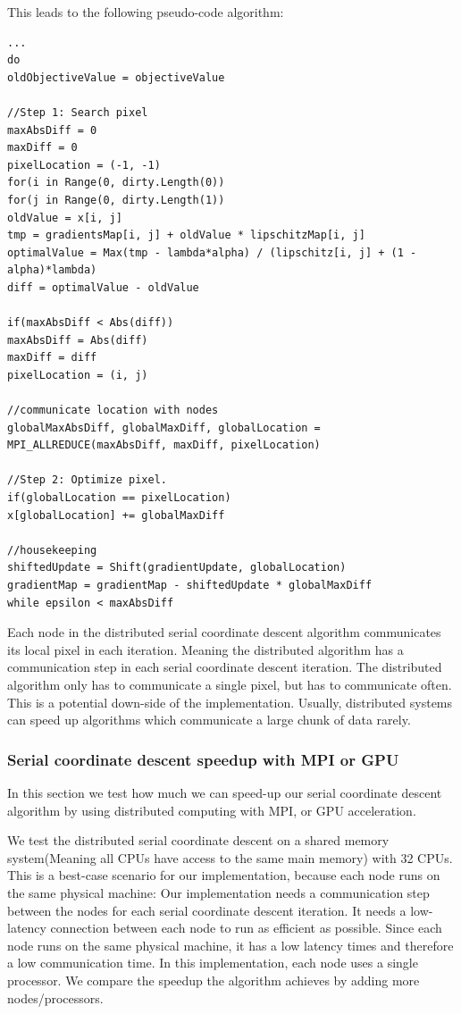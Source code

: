 This leads to the following pseudo-code algorithm:
\begin{lstlisting}
...
do 
oldObjectiveValue = objectiveValue

//Step 1: Search pixel
maxAbsDiff = 0
maxDiff = 0
pixelLocation = (-1, -1)
for(i in Range(0, dirty.Length(0))
for(j in Range(0, dirty.Length(1))
oldValue = x[i, j]
tmp = gradientsMap[i, j] + oldValue * lipschitzMap[i, j]
optimalValue = Max(tmp - lambda*alpha) / (lipschitz[i, j] + (1 - alpha)*lambda)
diff = optimalValue - oldValue

if(maxAbsDiff < Abs(diff))
maxAbsDiff = Abs(diff)
maxDiff = diff
pixelLocation = (i, j)

//communicate location with nodes
globalMaxAbsDiff, globalMaxDiff, globalLocation = MPI_ALLREDUCE(maxAbsDiff, maxDiff, pixelLocation)

//Step 2: Optimize pixel.
if(globalLocation == pixelLocation)
x[globalLocation] += globalMaxDiff

//housekeeping
shiftedUpdate = Shift(gradientUpdate, globalLocation)
gradientMap = gradientMap - shiftedUpdate * globalMaxDiff
while epsilon < maxAbsDiff
\end{lstlisting}

Each node in the distributed serial coordinate descent algorithm communicates its local pixel in each iteration. Meaning the distributed algorithm has a communication step in each serial coordinate descent iteration. The distributed algorithm only has to communicate a single pixel, but has to communicate often. This is a potential down-side of the implementation. Usually, distributed systems can speed up algorithms which communicate a large chunk of data rarely.

\subsubsection{Serial coordinate descent speedup with MPI or GPU}\label{results:speedup}
In this section we test how much we can speed-up our serial coordinate descent algorithm by using distributed computing with MPI, or GPU acceleration.

We test the distributed serial coordinate descent on a shared memory system(Meaning all CPUs have access to the same main memory) with 32 CPUs. This is a best-case scenario for our implementation, because each node runs on the same physical machine: Our implementation needs a communication step between the nodes for each serial coordinate descent iteration. It needs a low-latency connection between each node to run as efficient as possible. Since each node runs on the same physical machine, it has a low latency times and therefore a low communication time. In this implementation, each node uses a single processor. We compare the speedup the algorithm achieves by adding more nodes/processors.

